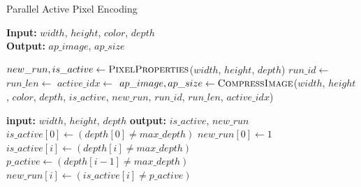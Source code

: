 \documentclass{vgtc}                          %
\makeatletter
\newcommand{\setalglineno}[1]{%
  \setcounter{ALG@line}{\numexpr#1-1}}
\makeatother
\begin{document}
\newlength{\textfloatsepsave}
\setlength{\textfloatsepsave}{\textfloatsep}
\setlength{\textfloatsep}{6pt}
\begin{algorithm}[th!] %
\caption{Parallel Active Pixel Encoding} \label{alg:gpu_active_pixel}
\textbf{Input:} $width$, $height$, $color$, $depth$\\
\textbf{Output:} $ap\_image$, $ap\_size$
\begin{algorithmic}[1]
\State $new\_run, is\_active \gets \textsc{PixelProperties}$($width$,
\Statex \qquad\quad$height$, $depth$)
\State $run\_id \gets$ 
\State $run\_len \gets$ 
\State $active\_idx \gets$ 
\State $ap\_image, ap\_size \gets \textsc{CompressImage}$($width$,
\Statex \qquad\quad$height$, $color$, $depth$, $is\_active$, $new\_run$,
\Statex \qquad\quad$run\_id$, $run\_len$, $active\_idx$)

\item[]
\setalglineno{1}
  \Statex \textbf{input:} $width$, $height$, $depth$
  \Statex \textbf{output:} $is\_active$, $new\_run$
  \State $is\_active[0] \gets (depth[0] \neq max\_depth)$
  \State $new\_run[0] \gets 1$
    \State $is\_active[i] \gets (depth[i] \neq max\_depth)$
    \State $p\_active \gets (depth[i - 1] \neq max\_depth)$
    \State $new\_run[i] \gets (is\_active[i] \neq p\_active)$
  \EndParFor
\EndProcedure


\end{algorithmic}
\end{algorithm}
\end{document}
